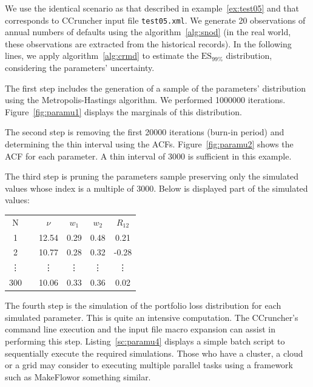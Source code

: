 \documentclass[11pt,fleqn]{book} %
\begin{document}
\begin{example}
	\label{ex:paramu}
	We use the identical scenario as that described in example~\ref{ex:test05} 
	and that corresponds to CCruncher input file \texttt{test05.xml}. We 
	generate 20 observations of annual numbers of defaults using the 
	algorithm~\ref{alg:snod} (in the real world, these observations are extracted
	from the historical records). 
	In the following lines, we apply algorithm~\ref{alg:crmd} to estimate 
	the $\text{ES}_{99\%}$ distribution, considering the parameters' 
	uncertainty. 

	The first step includes the generation of a sample of the parameters' 
	distribution using the Metropolis-Hastings algorithm. We performed 
	\num{1000000} iterations. Figure~\ref{fig:paramu1} displays the 
	marginals of this distribution.
	
	The second step is removing the first \num{20000} iterations (burn-in 
	period) and determining the thin interval using the ACFs. 
	Figure~\ref{fig:paramu2} shows the ACF for each parameter. A thin interval 
	of \num{3000} is sufficient in this example. 
	
	The third step is pruning the parameters sample preserving 
	only the simulated values whose index is a multiple of \num{3000}. 
	Below is displayed part of the simulated values:

	\hspace*{1cm}
	\begin{tabular}{cc|c|c|c|c|}
		\cline{1-1} \cline{3-6}
		\multicolumn{1}{|c|}{N} & & $\nu$ & $w_1$ & $w_2$ & $R_{12}$ \\
		\cline{1-1} \cline{3-6}
		\multicolumn{1}{|c|}{1} & & 12.54 & 0.29 & 0.48 & 0.21 \\
		\cline{1-1} \cline{3-6}
		\multicolumn{1}{|c|}{2} & & 10.77 & 0.28 & 0.32 & -0.28 \\
		\cline{1-1} \cline{3-6}
		\multicolumn{1}{|c|}{\vdots} & & \vdots & \vdots & \vdots & \vdots \\
		\cline{1-1} \cline{3-6}
		\multicolumn{1}{|c|}{300} & & 10.06 & 0.33 & 0.36 & 0.02 \\
		\cline{1-1} \cline{3-6}
	\end{tabular}

	The fourth step is the simulation of the portfolio loss distribution
	for each simulated parameter. This is quite an intensive computation.
	The CCruncher's command line execution and the input file macro expansion
	can assist in performing this step. Listing~\ref{sc:paramu4} displays a 
	simple batch script to sequentially execute the required simulations.
	Those who have a cluster, a cloud or a grid may consider to executing 
	multiple parallel tasks using a framework such as MakeFlow\footnotemark[1]
	or something similar. 


\end{example}
\end{document}
